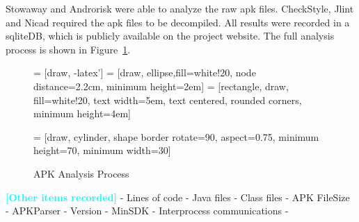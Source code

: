 \documentclass{sig-alternate}
\newcommand{\todo}[1]{\textcolor{cyan}{\textbf{[#1]}}}
\begin{document}
Stowaway and Androrisk were able to analyze the raw apk files. CheckStyle, Jlint and Nicad required the apk files to be decompiled. All results were recorded in a sqliteDB, which is publicly available on the project website. The full analysis process is shown in Figure~\ref{fig:analysisprocess}.

\begin{figure}[h]
\begin{center}
\caption{APK Analysis Process}
\label{fig:analysisprocess}
 = [draw, -latex']
 = [draw, ellipse,fill=white!20, node distance=2.2cm,
    minimum height=2em]
 = [rectangle, draw, fill=white!20,
    text width=5em, text centered, rounded corners, minimum height=4em]

 = [draw, cylinder, shape border rotate=90, aspect=0.75, %
      minimum height=70, minimum width=30]

\end{center}
\end{figure}


\todo{Other items recorded}
- Lines of code
- Java files
- Class files
- APK FileSize
- APKParser
-   Version
-   MinSDK
-   Interprocess communications
-
\end{document}
